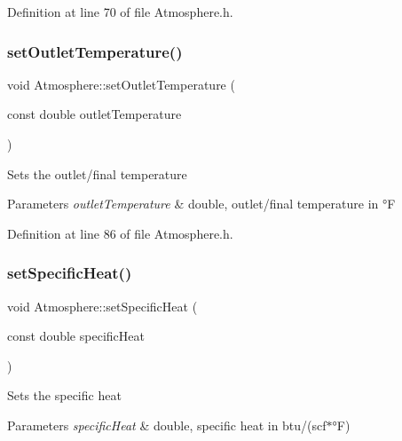 Definition at line 70 of file Atmosphere.\+h.

\mbox{\label{class_atmosphere_a8f6589ab4e17d3c531bb7e0e771f4f80}} 
\subsubsection{\texorpdfstring{set\+Outlet\+Temperature()}{setOutletTemperature()}}
{\footnotesize\ttfamily void Atmosphere\+::set\+Outlet\+Temperature (\begin{DoxyParamCaption}\item[{const double}]{outlet\+Temperature }\end{DoxyParamCaption})\hspace{0.3cm}{\ttfamily [inline]}}

Sets the outlet/final temperature 
\begin{DoxyParams}{Parameters}
{\em outlet\+Temperature} & double, outlet/final temperature in °F \\
\hline
\end{DoxyParams}


Definition at line 86 of file Atmosphere.\+h.

\mbox{\label{class_atmosphere_a17450de3bc7a64b2736b1fe8785410cd}} 
\subsubsection{\texorpdfstring{set\+Specific\+Heat()}{setSpecificHeat()}}
{\footnotesize\ttfamily void Atmosphere\+::set\+Specific\+Heat (\begin{DoxyParamCaption}\item[{const double}]{specific\+Heat }\end{DoxyParamCaption})\hspace{0.3cm}{\ttfamily [inline]}}

Sets the specific heat 
\begin{DoxyParams}{Parameters}
{\em specific\+Heat} & double, specific heat in btu/(scf$\ast$°F) \\
\hline
\end{DoxyParams}


